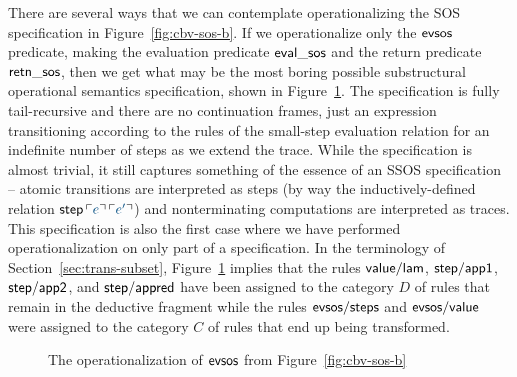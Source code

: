 There are several ways that we can contemplate operationalizing the
SOS specification in Figure~\ref{fig:cbv-sos-b}. If we operationalize
only the ${\sf evsos}$ predicate, making the evaluation predicate
${\sf eval\_sos}$ and the return predicate ${\sf retn\_sos}$, then we
get what may be the most boring possible substructural
operational semantics specification, shown in
Figure~\ref{fig:sos-tailrecursion}. The specification is fully
tail-recursive and there are no continuation frames, just an
expression transitioning according to the rules of the small-step
evaluation relation for an indefinite number of steps as we extend the
trace. While the specification is almost trivial, it still captures
something of the essence of an SSOS specification -- atomic transitions are
interpreted as steps (by way the inductively-defined relation ${\sf
  step}\,\interp{e}\,\interp{e'}$) and nonterminating computations are
interpreted as traces. This specification is also the first case where
we have performed operationalization on only part of a specification.
In the terminology of Section~\ref{sec:trans-subset},
Figure~\ref{fig:sos-tailrecursion} implies that the rules ${\sf
  value/lam}$, ${\sf step/app1}$, ${\sf step/app2}$, and ${\sf
  step/appred}$ have been assigned to the category $D$ of rules that
remain in the deductive fragment while the rules ${\sf evsos/steps}$
and ${\sf evsos/value}$ were assigned to the category $C$ of rules
that end up being transformed.


\begin{figure}[tp]
\begin{minipage}[b]{0.9\linewidth}
\end{minipage}
\caption{The operationalization of ${\sf evsos}$ from
  Figure~\ref{fig:cbv-sos-b}}
\label{fig:sos-tailrecursion}
\end{figure}



